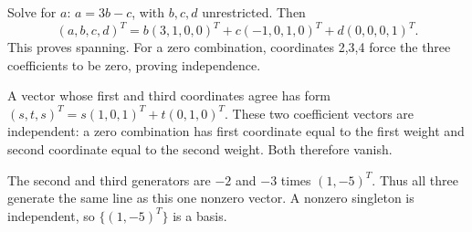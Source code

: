 Solve for $a$: $a=3b-c$, with $b,c,d$ unrestricted. Then
\[
(a,b,c,d)^T=b(3,1,0,0)^T+c(-1,0,1,0)^T+d(0,0,0,1)^T.
\]
This proves spanning. For a zero combination, coordinates 2,3,4
force the three coefficients to be zero, proving independence.

A vector whose first and third coordinates agree has form
$(s,t,s)^T=s(1,0,1)^T+t(0,1,0)^T$.
These two coefficient vectors are independent: a zero combination has
first coordinate equal to the first weight and second coordinate equal
to the second weight. Both therefore vanish.

The second and third generators are $-2$ and $-3$ times
$(1,-5)^T$. Thus all three generate the same line as this one nonzero
vector. A nonzero singleton is independent, so
$\{(1,-5)^T\}$ is a basis.

